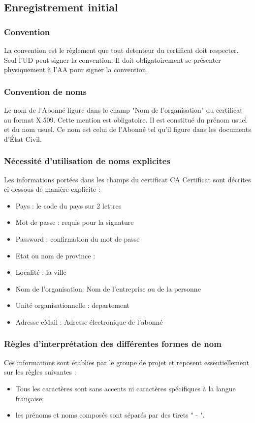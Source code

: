 \documentclass[a4paper,11pt,french]{book}
\begin{document}
\subsection{Enregistrement initial}
\subsubsection{Convention}
La convention est le règlement que tout detenteur du certificat doit respecter. Seul l'UD peut signer la convention. Il doit obligatoirement se présenter physiquement à l'AA pour signer la convention.

\subsubsection{Convention de noms}
Le nom de l'Abonné figure dans le champ "Nom de l'organisation" du certificat au format X.509. Cette mention est obligatoire. Il est constitué du prénom usuel et du nom usuel. Ce nom est celui de l'Abonné tel qu'il figure dans les documents d'État Civil.

\subsubsection{Nécessité d'utilisation de noms explicites}

Les informations portées dans les champs du certificat CA Certificat sont décrites ci-dessous de manière explicite :
\begin{itemize}
\item Pays : le code du pays sur 2 lettres
\item Mot de passe : requis pour la signature
\item Password : confirmation du mot de passe
\item Etat ou nom de province : 
\item Localité : la ville
\item Nom de l'organisation: Nom de l'entreprise ou de la personne
\item Unité organisationnelle : departement
\item Adresse eMail : Adresse électronique de l'abonné

\end{itemize}

\subsubsection{Règles d'interprétation des différentes formes de nom}
Ces informations sont établies par le groupe de projet et reposent essentiellement sur les règles
suivantes :
\begin{itemize}
\item Tous les caractères sont sans accents ni caractères spécifiques à la langue française;
\item les prénoms et noms composés sont séparés par des tirets " - ".

\end{itemize}
\end{document}

